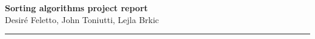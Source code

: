 \documentclass[a4paper,11pt]{article}
\renewenvironment{abstract}
 {\par\noindent\textbf{\abstractname}\ \ignorespaces \\}
 {\par\noindent\medskip}
\begin{document}
\renewcommand*{\thefootnote}{\fnsymbol{footnote}}

\makeatletter
\newcommand*{\NoBreakPar}{\vspace{\baselineskip}\par\nobreak\@afterheading}
\makeatother

\begin{center}
\Large{\textbf{Sorting algorithms project report}}
\vspace{0.4cm}
\normalsize
\\ Desiré Feletto, John Toniutti, Lejla Brkic \\

\vspace{0.4cm}
\normalsize

\end{center}

{\color{gray}\hrule}
\vspace{0.4cm}

%












\newpage


\end{document}
